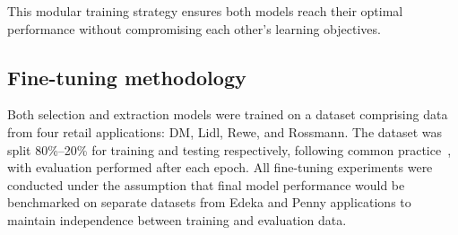 \documentclass[licencjacka,en]{pracamgr}
\begin{document}
This modular training strategy ensures both models reach their optimal performance without compromising each other's learning objectives.
\subsection{Fine-tuning methodology}
Both selection and extraction models were trained on a dataset comprising data from four retail applications: DM, Lidl, Rewe, and Rossmann. The dataset was split 80\%--20\% for training and testing respectively, following common practice~\cite{pp}, with evaluation performed after each epoch. All fine-tuning experiments were conducted under the assumption that final model performance would be benchmarked on separate datasets from Edeka and Penny applications to maintain independence between training and evaluation data.
\end{document}
